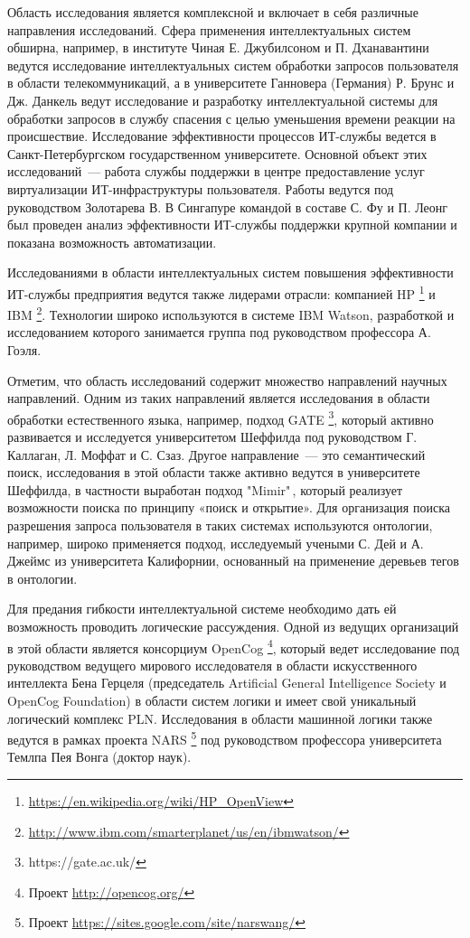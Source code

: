 Область исследования является комплексной и включает в себя различные направления исследований. Сфера применения интеллектуальных систем обширна, например, в институте Чиная Е. Джубилсоном и П. Дханавантини ведутся исследование интеллектуальных систем обработки запросов пользователя в области телекоммуникаций, а в университете Ганновера (Германия) Р. Брунс и Дж. Данкель ведут исследование и разработку интеллектуальной системы для обработки запросов в службу спасения с целью уменьшения времени реакции на происшествие. Исследование эффективности процессов ИТ-службы ведется в Санкт-Петербургском государственном университете. Основной объект этих исследований~--- работа службы поддержки в центре предоставление услуг виртуализации ИТ-инфраструктуры пользователя. Работы ведутся под руководством Золотарева В. В Сингапуре командой в составе С. Фу и П. Леонг был проведен анализ эффективности ИТ-службы поддержки крупной компании и показана возможность автоматизации.\par
Исследованиями в области интеллектуальных систем повышения эффективности ИТ-службы предприятия ведутся также лидерами отрасли: компанией HP \footnote{\url{https://en.wikipedia.org/wiki/HP_OpenView}} и IBM \footnote{\url{http://www.ibm.com/smarterplanet/us/en/ibmwatson/}}. Технологии широко используются в системе IBM Watson, разработкой и исследованием которого занимается группа под руководством профессора А. Гоэля.   

Отметим, что область исследований содержит множество направлений научных направлений. Одним из таких направлений является исследования в области обработки естественного языка, например, подход GATE \footnote{https://gate.ac.uk/}, который активно развивается и исследуется университетом Шеффилда под руководством Г. Каллаган, Л. Моффат и С. Сзаз. Другое направление~--- это семантический поиск, исследования в этой области также активно ведутся в университете Шеффилда, в частности выработан подход "Mimir"\,, который реализует возможности поиска по принципу «поиск и открытие». Для организация поиска разрешения запроса пользователя в таких системах используются онтологии, например, широко применяется подход, исследуемый учеными С. Дей и А. Джеймс из университета Калифорнии, основанный на применение деревьев тегов в онтологии. \par
Для предания гибкости интеллектуальной системе необходимо дать ей возможность проводить логические рассуждения. Одной из ведущих организаций в этой области является консорциум OpenCog \footnote{Проект \url{http://opencog.org/}}, который ведет исследование под руководством ведущего мирового исследователя в области искусственного интеллекта Бена Герцеля (председатель Artificial General Intelligence Society и OpenCog Foundation) в области систем логики и имеет свой уникальный логический комплекс PLN. Исследования в области машинной логики также ведутся в рамках проекта NARS \footnote{Проект \url{https://sites.google.com/site/narswang/}} под руководством профессора университета Темлпа Пея Вонга (доктор наук). \par 


